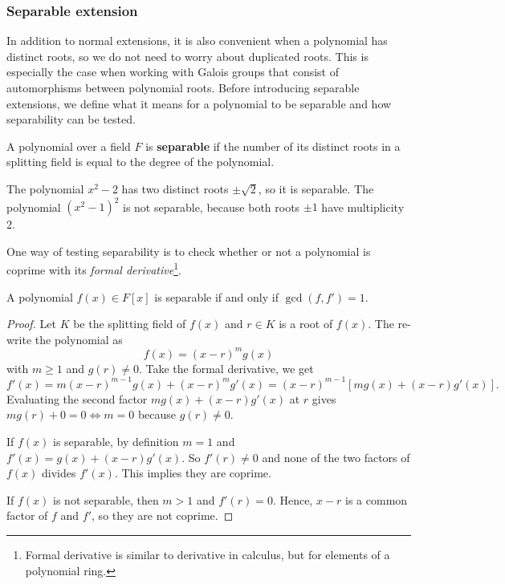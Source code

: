\documentclass[../main.tex]{subfiles}
\begin{document}
\subsubsection{Separable extension}

In addition to normal extensions, it is also convenient when a polynomial has distinct roots, so we do not need to worry about duplicated roots. This is especially the case when working with Galois groups that consist of automorphisms between polynomial roots. Before introducing separable extensions, we define what it means for a polynomial to be separable and how separability can be tested. 

\reversemarginpar
{}
\begin{definition}
A polynomial over a field $F$ is \textbf{separable} if the number of its distinct roots in a splitting field is equal to the degree of the polynomial. 
\end{definition}

\begin{example}
The polynomial $x^2-2$ has two distinct roots $\pm \sqrt{2}$, so it is separable. 
The polynomial $(x^2-1)^2$ is not separable, because both roots $\pm 1$ have multiplicity 2. 
\end{example}

\reversemarginpar
{}
One way of testing separability is to check whether or not a polynomial is coprime with its \textit{formal derivative}\footnote{Formal derivative is similar to derivative in calculus, but for elements of a polynomial ring.}. 
\begin{lemma}
A polynomial $f(x) \in F[x]$ is separable if and only if $\gcd(f,f')=1$.
\end{lemma}
\begin{proof}
Let $K$ be the splitting field of $f(x)$ and $r \in K$ is a root of $f(x)$. The re-write the polynomial as 
\begin{equation*}
    f(x)=(x-r)^m g(x)
\end{equation*}
with $m \ge 1$ and $g(r) \neq 0$. Take the formal derivative, we get
\begin{equation*}
    f'(x) = m(x-r)^{m-1} g(x) + (x-r)^m g'(x) = (x-r)^{m-1} [mg(x) + (x-r)g'(x)].
\end{equation*}
Evaluating the second factor $mg(x) + (x-r)g'(x)$ at $r$ gives $mg(r) + 0 = 0 \iff m = 0$ because $g(r) \neq 0$.  

If $f(x)$ is separable, by definition $m = 1$ and $f'(x) = g(x) + (x-r)g'(x)$. So $f'(r) \neq 0$ and none of the two factors of $f(x)$ divides $f'(x)$. This implies they are coprime. 

If $f(x)$ is not separable, then $m > 1$ and $f'(r)=0$. Hence, $x-r$ is a common factor of $f$ and $f'$, so they are not coprime. 
\end{proof}
\end{document}
